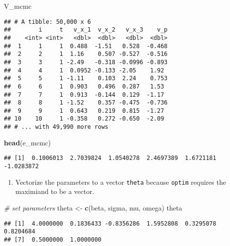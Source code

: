 \documentclass[
]{book}
\newenvironment{Shaded}{\begin{snugshade}}{\end{snugshade}}
\newcommand{\CommentTok}[1]{\textcolor[rgb]{0.56,0.35,0.01}{\textit{#1}}}
\newcommand{\KeywordTok}[1]{\textcolor[rgb]{0.13,0.29,0.53}{\textbf{#1}}}
\newcommand{\NormalTok}[1]{#1}
\newcommand{\StringTok}[1]{\textcolor[rgb]{0.31,0.60,0.02}{#1}}
\providecommand{\tightlist}{%
  \setlength{\itemsep}{0pt}\setlength{\parskip}{0pt}}
\begin{document}
\begin{Shaded}
\begin{Highlighting}[]
\NormalTok{V_mcmc}
\end{Highlighting}
\end{Shaded}

\begin{verbatim}
## # A tibble: 50,000 x 6
##        i     t   v_x_1  v_x_2   v_x_3    v_p
##    <int> <int>   <dbl>  <dbl>   <dbl>  <dbl>
##  1     1     1  0.488  -1.51   0.528  -0.468
##  2     2     1  1.16    0.507 -0.527  -0.516
##  3     3     1 -2.49   -0.318 -0.0996 -0.893
##  4     4     1  0.0952 -0.133 -2.05    1.92 
##  5     5     1 -1.11    0.103  2.24    0.753
##  6     6     1  0.903   0.496  0.287   1.53 
##  7     7     1  0.913  -0.144  0.129  -1.17 
##  8     8     1 -1.52    0.357 -0.475  -0.736
##  9     9     1  0.643   0.219  0.815  -1.27 
## 10    10     1 -0.358   0.272 -0.650  -2.09 
## # ... with 49,990 more rows
\end{verbatim}

\begin{Shaded}
\begin{Highlighting}[]
\KeywordTok{head}\NormalTok{(e_mcmc)}
\end{Highlighting}
\end{Shaded}

\begin{verbatim}
## [1]  0.1006013  2.7039824  1.0540278  2.4697389  1.6721181 -1.0283872
\end{verbatim}

\begin{enumerate}
\def\labelenumi{\arabic{enumi}.}
\setcounter{enumi}{1}
\tightlist
\item
  Vectorize the parameters to a vector \texttt{theta} because \texttt{optim} requires the maximiand to be a vector.
\end{enumerate}

\begin{Shaded}
\begin{Highlighting}[]
\CommentTok{# set parameters}
\NormalTok{theta <-}\StringTok{ }\KeywordTok{c}\NormalTok{(beta, sigma, mu, omega)}
\NormalTok{theta}
\end{Highlighting}
\end{Shaded}

\begin{verbatim}
## [1]  4.0000000  0.1836433 -0.8356286  1.5952808  0.3295078  0.8204684
## [7]  0.5000000  1.0000000
\end{verbatim}
\end{document}
